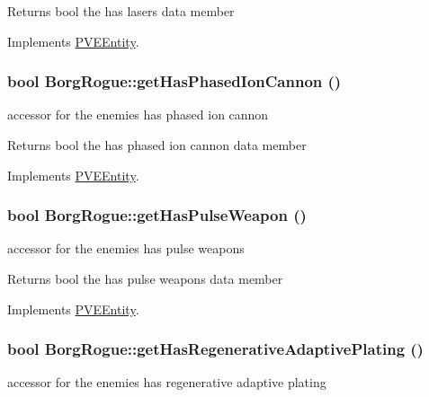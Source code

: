\begin{DoxyReturn}{Returns}
bool the has lasers data member 
\end{DoxyReturn}


Implements \hyperlink{classPVEEntity}{PVEEntity}.

\hypertarget{classBorgRogue_af2c0c7885c76c080c2e255069672c13b}{
\subsubsection[{getHasPhasedIonCannon}]{\setlength{\rightskip}{0pt plus 5cm}bool BorgRogue::getHasPhasedIonCannon ()}}
\label{db/d4f/classBorgRogue_af2c0c7885c76c080c2e255069672c13b}
accessor for the enemies has phased ion cannon

\begin{DoxyReturn}{Returns}
bool the has phased ion cannon data member 
\end{DoxyReturn}


Implements \hyperlink{classPVEEntity}{PVEEntity}.

\hypertarget{classBorgRogue_acfd7c55d67ff89410eed4270c88f0e2f}{
\subsubsection[{getHasPulseWeapon}]{\setlength{\rightskip}{0pt plus 5cm}bool BorgRogue::getHasPulseWeapon ()}}
\label{db/d4f/classBorgRogue_acfd7c55d67ff89410eed4270c88f0e2f}
accessor for the enemies has pulse weapons

\begin{DoxyReturn}{Returns}
bool the has pulse weapons data member 
\end{DoxyReturn}


Implements \hyperlink{classPVEEntity}{PVEEntity}.

\hypertarget{classBorgRogue_aff3dbb33470200cc97860ca2d4b22ca5}{
\subsubsection[{getHasRegenerativeAdaptivePlating}]{\setlength{\rightskip}{0pt plus 5cm}bool BorgRogue::getHasRegenerativeAdaptivePlating ()}}
\label{db/d4f/classBorgRogue_aff3dbb33470200cc97860ca2d4b22ca5}
accessor for the enemies has regenerative adaptive plating

